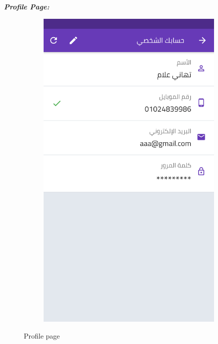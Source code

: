 \par  \textbf{\textit{Profile Page:}}
\begin{figure}[H] 
      \centering

  \begin{subfigure}[b]{0.5\linewidth}
    \centering
    \includegraphics[width=0.5\linewidth]{images/ch3/Profile/0.png}
  
    \label{fig7:c} 
  \end{subfigure}%
      \caption{Profile page}

  \label{fig7} 
\end{figure}

